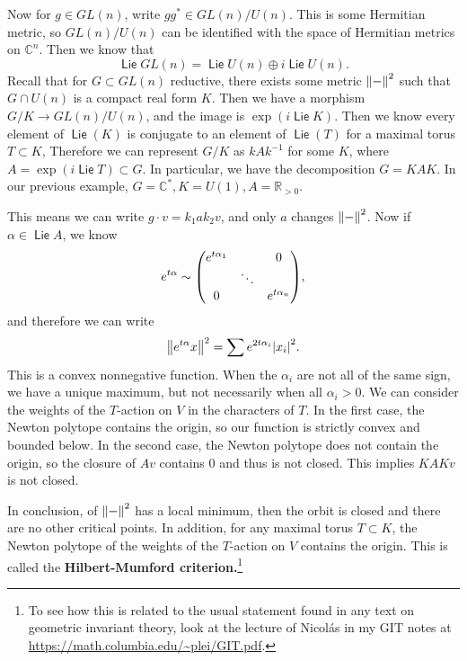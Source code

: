 \documentclass[leqno, openany]{memoir}
\theoremstyle{definition}
\theoremstyle{remark}
\theoremstyle{plain}
\theoremstyle{definition}
\theoremstyle{remark}
\newcommand{\R}{\mathbb{R}}
\newcommand{\C}{\mathbb{C}}
\DeclareMathOperator{\Lie}{\mathsf{Lie}}
\begin{document}
Now for $g \in GL(n)$, write $gg^* \in GL(n)/U(n)$. This is some Hermitian metric, so $GL(n)/U(n)$ can be identified with the space of Hermitian metrics on $\C^n$. Then we know that
\[ \Lie GL(n) = \Lie U(n) \oplus i \Lie U(n). \]
Recall that for $G \subset GL(n)$ reductive, there exists some metric $\norm{-}^2$ such that $G \cap U(n)$ is a compact real form $K$. Then we have a morphism $G/K \to GL(n) / U(n)$, and the image is $\exp (i \Lie K)$. Then we know every element of $\Lie(K)$ is conjugate to an element of $\Lie(T)$ for a maximal torus $T \subset K$, Therefore we can represent $G/K$ as $kAk^{-1}$ for some $K$, where $A = \exp(i \Lie T) \subset G$. In particular, we have the decomposition $G = KAK$. In our previous example, $G = \C^*, K = U(1), A = \R_{>0}$.

This means we can write $g \cdot v = k_1 a k_2 v$, and only $a$ changes $\norm{-}^2$. Now if $\alpha \in \Lie A$, we know 
\[ e^{t \alpha} \sim \mqty( e^{t \alpha_1} & & 0 \\ & \ddots & \\ 0 & & e^{t \alpha_n} ), \]
and therefore we can write
\[ \norm{e^{t \alpha} x}^2 = \sum e^{2 t \alpha_i} \abs{x_i}^2. \]
This is a convex nonnegative function. When the $\alpha_i$ are not all of the same sign, we have a unique maximum, but not necessarily when all $\alpha_i > 0$. We can consider the weights of the $T$-action on $V$ in the characters of $T$. In the first case, the Newton polytope contains the origin, so our function is strictly convex and bounded below. In the second case, the Newton polytope does not contain the origin, so the closure of $Av$ contains $0$ and thus is not closed. This implies $KAKv$ is not closed.

In conclusion, of $\norm{-}^2$ has a local minimum, then the orbit is closed and there are no other critical points. In addition, for any maximal torus $T \subset K$, the Newton polytope of the weights of the $T$-action on $V$ contains the origin. This is called the \textbf{Hilbert-Mumford criterion.}\footnote{To see how this is related to the usual statement found in any text on geometric invariant theory, look at the lecture of Nicol\'as in my GIT notes at \url{https://math.columbia.edu/~plei/GIT.pdf}.} 
\end{document}
